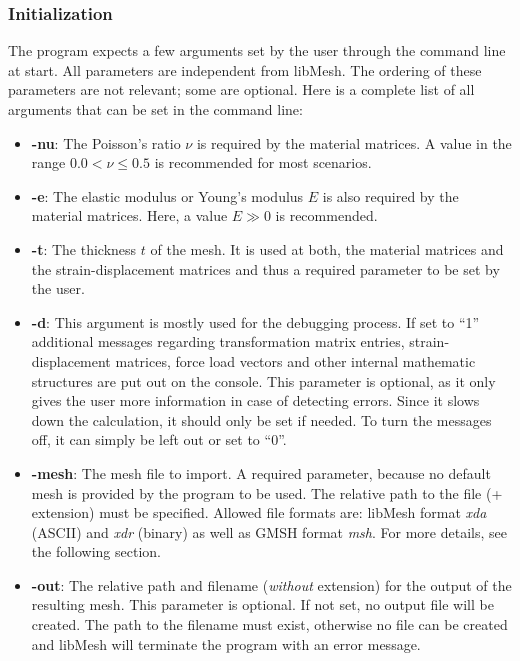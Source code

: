   \subsubsection{Initialization}\label{sec:Impl-Details-Init}
  The program expects a few arguments set by the user through the command line at start. All parameters are independent from libMesh. The ordering of these parameters are not relevant; some are optional. Here is a complete list of all arguments that can be set in the command line:
  \begin{itemize}
  	\item \textbf{-nu}: The Poisson's ratio $\nu$ is required by the material matrices. A value in the range $0.0 < \nu \leq 0.5$ is recommended for most scenarios.
  	\item \textbf{-e}: The elastic modulus or Young's modulus $E$ is also required by the material matrices. Here, a value $E \gg 0$ is recommended.
  	\item \textbf{-t}: The thickness $t$ of the mesh. It is used at both, the material matrices and the strain-displacement matrices and thus a required parameter to be set by the user.
  	\item \textbf{-d}: This argument is mostly used for the debugging process. If set to ``1'' additional messages regarding transformation matrix entries, strain-displacement matrices, force load vectors and other internal mathematic structures are put out on the console. This parameter is optional, as it only gives the user more information in case of detecting errors. Since it slows down the calculation, it should only be set if needed. To turn the messages off, it can simply be left out or set to ``0''.
  	\item \textbf{-mesh}: The mesh file to import. A required parameter, because no default mesh is provided by the program to be used. The relative path to the file (+ extension) must be specified. Allowed file formats are: libMesh format \textit{xda} (ASCII) and \textit{xdr} (binary) as well as GMSH format \textit{msh}. For more details, see the following section.
  	\item \textbf{-out}: The relative path and filename (\textit{without} extension) for the output of the resulting mesh. This parameter is optional. If not set, no output file will be created. The path to the filename must exist, otherwise no file can be created and libMesh will terminate the program with an error message.
  \end{itemize}
  

